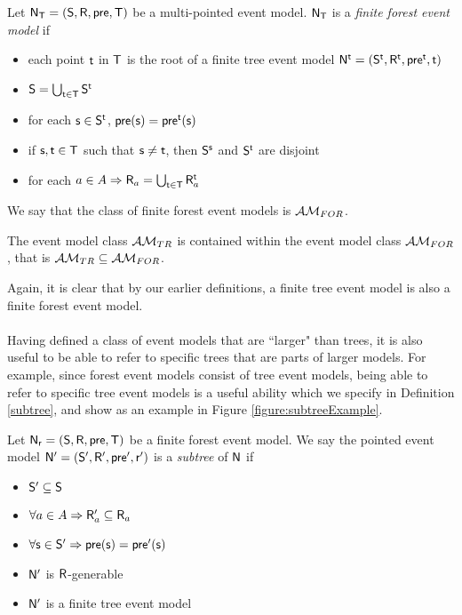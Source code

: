 \begin{defn} \label{forest}
Let $\evM_\evT = (\evS, \evR, \evpr, \evT)$ be a multi-pointed event model.
$\evM_\evT$ is a {\em finite forest event model} if
\begin{itemize}
	\item each point $\evt$ in $\evT$ is the root of a finite tree event model $\evM^\evt =
	(\evS^\evt, \evR^\evt,
	\evpr^\evt, \evt)$
  \item $\evS = \bigcup_{\evt \in \evT} \evS^\evt$
	\item for each $\evs \in \evS^\evt$, $\evpr(\evs) = \evpr^\evt(\evs)$
	\item if $\evs, \evt \in \evT$ such that $\evs \neq \evt$, then $\evS^\evs$ and $\evS^\evt$ are disjoint
  \item for each $a \in A \Rightarrow \evR_a = \bigcup_{\evt \in \evT} \evR_a^\evt$
\end{itemize}
\end{defn}

We say that the class of finite forest event models is $\forestClass$.

\begin{lemma} \label{treeIsForest}
The event model class $\treeClass$ is contained within the event model class
$\forestClass$, that is $\treeClass \subseteq \forestClass$.
\end{lemma}

Again, it is clear that by our earlier definitions, a finite tree event model is also a finite forest event
model.\\
\\
Having defined a class of event models that are ``larger" than trees, it is also useful to be able
to refer to specific trees that are parts of larger models.
For example, since forest event models consist of tree event models, being able to refer to specific
tree event models is a useful ability which we specify in Definition \ref{subtree}, and show as an
example in Figure \ref{figure:subtreeExample}.

\begin{defn} \label{subtree}
Let $\evM_\evr = (\evS, \evR, \evpr, \evT)$ be a finite forest event model.
We say the pointed event model $\evM' = (\evS', \evR', \evpr', \evr')$ is a {\em subtree} of $\evM$ if
\begin{itemize}
	\item $\evS' \subseteq \evS$
	\item $\forall a \in A \Rightarrow \evR_a' \subseteq \evR_a$
	\item $\forall \evs \in \evS' \Rightarrow \evpr(\evs) = \evpr'(\evs) $
	\item $\evM'$ is $\evR$-generable
	\item $\evM'$ is a finite tree event model
\end{itemize}
\end{defn}

